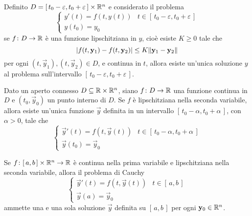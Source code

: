 	\begin{teorema}\label{th:picard-lindelof}
		Definito \(D = [\, t_0 - \varepsilon, t_0 + \varepsilon \,] \times \mathbb{R}^n\) e considerato il problema
		\begin{equation*}
			\begin{cases}
				y' (t) = f (t, y(t)) & t \in [\, t_0 - \varepsilon, t_0 + \varepsilon \,] \\
				y (t_0) = y_0
			\end{cases}
		\end{equation*}
		se \(f \colon D \to \mathbb{R}\) è una funzione lipschitziana in \(y\), cioè esiste \(K \ge 0\) tale che
		\begin{equation*}
			\abs{f (t, \mathbf{y}_1) - f(t, \mathbf{y}_2)} \le K \norm{\mathbf{y}_1 - \mathbf{y}_2}
		\end{equation*}
		per ogni \((t, \vec{y}_1), (t, \vec{y}_2) \in D\), e continua in \(t\), allora esiste un'unica soluzione \(y\) al problema sull'intervallo \([\, t_0 - \varepsilon, t_0 + \varepsilon \,]\).
	\end{teorema}

	\begin{teorema}\label{th:cauchy-locale}
		Dato un aperto connesso \(D \subseteq \mathbb{R} \times \mathbb{R}^n\), siano \(f \colon D \to \mathbb{R}\) una funzione continua in \(D\) e \((t_0, \vec{y}_0)\) un punto interno di \(D\). Se \(f\) è lipschitziana nella seconda variabile, allora esiste un'unica funzione \(\vec{y}\) definita in un intervallo \([\, t_0 - \alpha, t_0 + \alpha \,]\), con \(\alpha > 0\), tale che
		\begin{equation*}
			\begin{cases}
				\vec{y}' (t) = f (t, \vec{y} (t)) & t \in [\, t_0 - \alpha, t_0 + \alpha \,] \\
				\vec{y} (t_0) = \vec{y}_0
			\end{cases}
		\end{equation*}
	\end{teorema}

	\begin{teorema}\label{th:cauchy-globale}
		Se \(f \colon [\, a, b \,] \times \mathbb{R}^n \to \mathbb{R}\) è continua nella prima variabile e lipschitziana nella seconda variabile, allora il problema di Cauchy
		\begin{equation*}
			\begin{cases}
				\vec{y}' (t) = f (t, \vec{y} (t)) & t \in [\, a, b \,] \\
				\vec{y} (a) = \vec{y}_0
			\end{cases}
		\end{equation*}
		ammette una e una sola soluzione \(\vec{y}\) definita su \([\, a, b \,]\) per ogni \(\mathbf{y}_0 \in \mathbb{R}^n\).
	\end{teorema}

